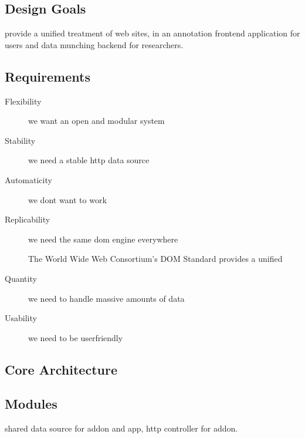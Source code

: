 \subsection{Design Goals}

provide a unified treatment of web sites, in an annotation frontend application for users and data munching backend for researchers.

\subsection{Requirements}

\begin{description}

\item[Flexibility]
we want an open and modular system

\item[Stability]
we need a stable http data source

\item[Automaticity]
we dont want to work

\item[Replicability]
we need the same dom engine everywhere

The World Wide Web Consortium's DOM Standard \cite{dom} provides a unified 

\item[Quantity]
we need to handle massive amounts of data

\item[Usability]
we need to be userfriendly

\end{description}

\subsection{Core Architecture}

\subsection{Modules}

shared data source for addon and app, http controller for addon.
